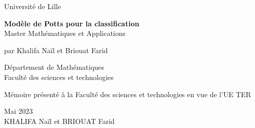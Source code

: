 \sloppy
\begin{titlepage}
  \begin{singlespace}
\begin{center}
{Université de Lille} \vspace{1.5 cm}\\
\end{center}

\begin{center}


\Large{{\bf{Modèle de Potts pour la classification}}\\Master Mathématiques et Applications}


\end{center}
\vspace{1.5 cm}
\begin{center}
\normalsize{par Khalifa Naïl et Briouat Farid}
\vspace{1.5 cm}
\end{center}

\begin{center}
Département de Mathématiques\\
Faculté des sciences et technologies
\end{center}
\vspace{1.5 cm}

\begin{center}
  Mémoire présenté à la Faculté des sciences et technologies en vue de l'UE TER
\end{center}
\vspace{1.5 cm}






\begin{center}
Mai 2023\\
\vspace{3 cm}
KHALIFA Naïl et BRIOUAT Farid
\end{center}
  \end{singlespace}

  \newpage
\end{titlepage} 
